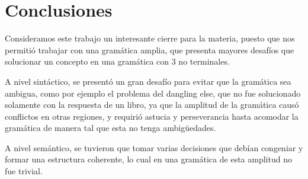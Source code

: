 \section{Conclusiones}

Consideramos este trabajo un interesante cierre para la materia, puesto que nos permitió trabajar con una gramática amplia, que presenta mayores desafíos que solucionar un concepto en una gramática con 3 no terminales.

A nivel sintáctico, se presentó un gran desafío para evitar que la gramática sea ambigua, como por ejemplo el problema del dangling else, que no fue solucionado solamente con la respuesta de un libro, ya que la amplitud de la gramática causó conflictos en otras regiones, y requirió astucia y perseverancia hasta acomodar la gramática de manera tal que esta no tenga ambigüedades.

A nivel semántico, se tuvieron que tomar varias decisiones que debían congeniar y formar una estructura coherente, lo cual en una gramática de esta amplitud no fue trivial.

